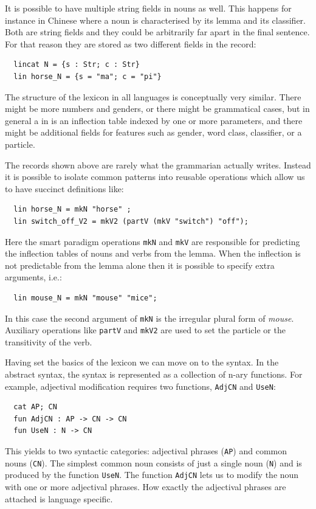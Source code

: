 \documentclass[output=paper]{langsci/langscibook}
\begin{document}
It is possible to have multiple string fields in nouns as well. This happens for instance in Chinese where a noun is characterised by its lemma and its classifier. Both are string fields and they could be arbitrarily far apart in the final sentence. For that reason they are stored as two different fields in the record:
\begin{verbatim}
  lincat N = {s : Str; c : Str}
  lin horse_N = {s = "ma"; c = "pi"}
\end{verbatim}

The structure of the lexicon in all languages is 
conceptually very similar. There might be more numbers and genders, 
or there might be grammatical cases, but in general a  in 
 is an inflection table indexed by one or more parameters, and 
there might be additional fields for features such as gender, 
word class, classifier, or a particle. 

The records shown above are rarely what 
the  grammarian actually writes. Instead it is possible to 
isolate common patterns into reusable operations which allow us to 
have succinct definitions like:
\begin{verbatim}
  lin horse_N = mkN "horse" ;
  lin switch_off_V2 = mkV2 (partV (mkV "switch") "off");
\end{verbatim}
Here the smart paradigm \citep{dblp:conf/eacl/detrezr12} operations 
\verb=mkN= and \verb=mkV= are responsible for predicting 
the inflection tables of nouns and verbs from the lemma. 
When the inflection is not predictable from the lemma alone then 
it is possible to specify extra arguments, i.e.:
\begin{verbatim}
  lin mouse_N = mkN "mouse" "mice";
\end{verbatim}
In this case the second argument of \verb=mkN= is 
the irregular plural form of \textit{mouse}. Auxiliary operations 
like \verb=partV= and \verb=mkV2= are used to set the particle or 
the transitivity of the verb.

Having set the basics of the lexicon we can move on to the syntax. 
In the abstract syntax, the syntax is represented as a collection of 
n-ary functions. For example, adjectival modification requires two 
functions, \verb=AdjCN= and \verb=UseN=:
\begin{verbatim}
  cat AP; CN
  fun AdjCN : AP -> CN -> CN
  fun UseN : N -> CN
\end{verbatim}
This yields to two syntactic categories: adjectival phrases (\verb=AP=) and 
common nouns (\verb=CN=). The simplest common noun consists of just 
a single noun (\verb=N=) and is produced by the function \verb=UseN=. 
The function \verb=AdjCN= lets us to modify the noun with one or 
more adjectival phrases. How exactly the adjectival phrases are
attached is language specific.
\end{document}
